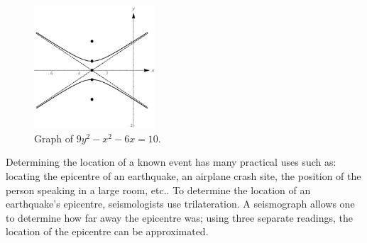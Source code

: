 \begin{example}
\begin{figure}[H]
	\begin{center}
			\includegraphics[width=0.4\textwidth]{fig_algebraic_34}
	\caption{Graph of $9y^2-x^2-6x=10$.}
	\label{fig_algebraic_34}
	\end{center}
\end{figure}


\end{example}
\fi

\ifcourse
Determining the location of a known event has many practical uses such as: locating the epicentre of an earthquake, an airplane crash site, the position of the person speaking in a large room, etc..  To determine the location of an earthquake's epicentre, seismologists use trilateration. A seismograph allows one to determine how far away the epicentre was; using three separate readings, the location of the epicentre can be approximated.


